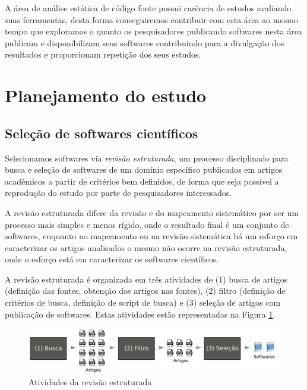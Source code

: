 A área de análise estática de código fonte possui carência de estudos avaliando
suas ferramentas, desta forma conseguiremos contribuir com esta área ao mesmo
tempo que exploramos o quanto os pesquisadores publicando softwares nesta área
publicam e disponibilizam seus softwares contribuindo para a divulgação dos
resultados e proporcionam repetição dos seus estudos.

\section{Planejamento do estudo}

\subsection{Seleção de softwares científicos}

Selecionamos softwares via {\it revisão estruturada}, um processo disciplinado
para busca e seleção de softwares de um domínio específico publicados em
artigos acadêmicos a partir de critérios bem definidos, de forma que seja
possível a reprodução do estudo por parte de pesquisadores interessados.

A revisão estruturada difere da revisão e do mapeamento sistemático
\cite{Kitchenham2007} por ser um processo mais simples e menos rígido, onde o
resultado final é um conjunto de softwares, enquanto no mapeamento ou na
revisão sistemática há um esforço em caracterizar os artigos analisados o mesmo
não ocorre na revisão estruturada, onde o esforço está em caracterizar os
softwares científicos.

A revisão estruturada é organizada em três atividades de (1) busca de artigos
(definição das fontes, obtenção dos artigos nas fontes), (2) filtro (definição
de critérios de busca, definição de script de busca) e (3) seleção de artigos
com publicação de softwares. Estas atividades estão representadas na Figura
\ref{figura-revisao-estruturada}.

\begin{figure}[h]
  \center
  \includegraphics[scale=0.21]{imagens/revisao-estruturada.png}
  \caption{Atividades da revisão estruturada}
  \label{figura-revisao-estruturada}
\end{figure}


